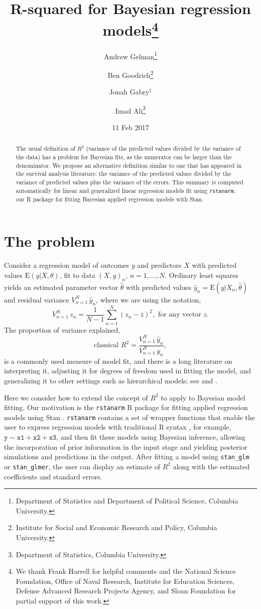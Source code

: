 \documentclass[11pt]{article}
\title{\bf R-squared for Bayesian regression models\footnote{
  We thank Frank Harrell for helpful comments and the National Science Foundation,
  Office of Naval Research, Institute for Education Sciences, Defense Advanced Research Projects Agency, and Sloan Foundation
  for partial support of this work.
}\vspace{.1in}}
\author{Andrew Gelman\footnote{Department of Statistics and Department of Political Science, Columbia University.}
  \and Ben Goodrich\footnote{Institute for Social and Economic Research and Policy, Columbia University.}
  \and Jonah Gabry$^\ddagger$
  \and Imad Ali\footnote{Department of Statistics, Columbia University.
}\vspace{.1in}}
\date{11 Feb 2017\vspace{-.1in}}
\begin{document}
\sloppy
\maketitle
\thispagestyle{empty}

\begin{abstract}
The usual definition of $R^2$ (variance of the predicted values divided by the
variance of the data) has a problem for Bayesian fits, as the numerator can be
larger than the denominator.  We propose an alternative definition similar to
one that has appeared in the survival analysis literature:  the variance of the
predicted values divided by the variance of predicted values plus the variance 
of the errors. This summary is computed automatically for linear and
generalized linear regression models fit using {\tt rstanarm}, our R package
for fitting Bayesian applied regression models with Stan.
\end{abstract}

\section{The problem}

Consider a regression model of outcomes $y$ and predictors $X$ with predicted
values $\mbox{E}(y|X,\theta)$, fit to data $(X,y)_n, \, n=1,\ldots,N$.  Ordinary
least squares yields an estimated parameter vector $\hat{\theta}$
with predicted values $\hat{y}_n = \mbox{E}(y | X_n, \hat{\theta})$ and residual
variance $V_{n=1}^N \,\hat{y}_n$, where we are using the notation,
%
$$
V_{n=1}^N \, z_n = \frac{1}{N-1}\sum_{n=1}^N (z_n - \bar{z})^2, \mbox{ for any vector }z.
$$
%
The proportion of variance explained,
%
\begin{equation}\label{rsq1}
\mbox{classical } R^2 = \frac{V_{n=1}^N \,\hat{y}_n}{V_{n=1}^N \,y_n},
\end{equation}
%
is a commonly used measure of model fit, and there is a long literature on
interpreting it, adjusting it for degrees of freedom used in fitting the model,
and generalizing it to other settings such as hierarchical models; see \cite{Xu2003}
and \cite{GelmanPardoe2006}.

Here we consider how to extend the concept of $R^2$ to apply to Bayesian model
fitting.  Our motivation is the {\tt rstanarm} R package
\citep{rstanarmRpackage} for fitting applied regression models using Stan
\citep{stan}. {\tt rstanarm} contains a set of wrapper functions that enable the
user to express regression models with traditional R syntax \citep{rcore}, for example, $\mathtt{y \sim x1 + x2 + x3}$, and then fit these models using Bayesian inference, allowing the incorporation
of prior information in the input stage and yielding posterior simulations and
predictions in the output.  After fitting a model using \verb#stan_glm#
or \verb#stan_glmer#, the user can display an estimate of $R^2$
along with the estimated coefficients and standard errors.
\end{document}
